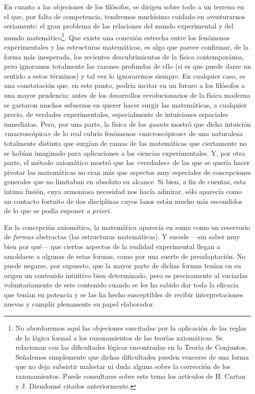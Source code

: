 \documentclass[a4paper, 12pt, draft]{article}
\begin{document}
En cuanto a las objeciones de los filósofos, se dirigen sobre todo a un terreno en el que, por falta de competencia, tendremos muchísimo cuidado en aventurarnos seriamente: el gran problema de las relaciones del mundo experimental y del mundo matemático\footnote{No abordaremos aquí las objeciones suscitadas por la aplicación de las reglas de la lógica formal a los razonamientos de las teorías axiomáticas. Se relacionan con las dificultades lógicas encontradas en la Teoría de Conjuntos. Señalemos simplemente que dichas dificultades pueden vencerse de una forma que no deja subsistir malestar ni duda alguna sobre la corrección de los razonamientos. Puede consultarse sobre este tema los artículos de H. Cartan y J. Dieudonné citados anteriormente.}. Que existe una conexión estrecha entre los fenómenos experimentales y las estructuras matemáticas, es algo que parece confirmar, de la forma más inesperada, los recientes descubrimientos de la física contemporánea, pero ignoramos totalmente las razones profundas de ello (si es que puede darse un sentido a estos términos) y tal vez lo ignoraremos siempre. En cualquier caso, es una constatación que, en este punto, podría incitar en un futuro a los filósofos a una mayor prudencia: antes de los desarrollos revolucionarios de la física moderna se gastaron muchos esfuerzos en querer hacer surgir las matemáticas, a cualquier precio, de verdades experimentales, especialmente de intuiciones espaciales inmediatas. Pero, por una parte, la física de los \textit{quanta} mostró que dicha intuición «macroscópica» de lo real cubría fenómenos «microscópicos» de una naturaleza totalmente distinta que surgían de ramas de las matemáticas que ciertamente no se habían imaginado para aplicaciones a las ciencias experimentales. Y, por otra parte, el método axiomático mostró que las «verdades» de las que se quería hacer pivotar las matemáticas no eran más que aspectos muy especiales de concepciones generales que no limitaban en absoluto su alcance. Si bien, a fin de cuentas, esta íntima fusión, cuya armoniosa necesidad nos hacía admirar, sólo aparecía como un contacto fortuito de dos disciplinas cuyos lazos están mucho más escondidos de lo que se podía suponer \textit{a priori.}

En la concepción axiomática, la matemática aparecía en suma como un reservorio de \textit{formas} abstractas (las estructuras matemáticas). Y sucede ---sin saber muy bien por qué--- que ciertos aspectos de la realidad experimental llegan a amoldarse a algunas de estas formas, como por una suerte de preadaptación. No puede negarse, por supuesto, que la mayor parte de dichas formas tenían en su origen un contenido intuitivo bien determinado, pero es precisamente al vaciarlas voluntariamente de este contenido cuando se les ha sabido dar toda la eficacia que tenían en potencia y se las ha hecho susceptibles de recibir interpretaciones nuevas y cumplir plenamente su papel elaborador.
\end{document}
